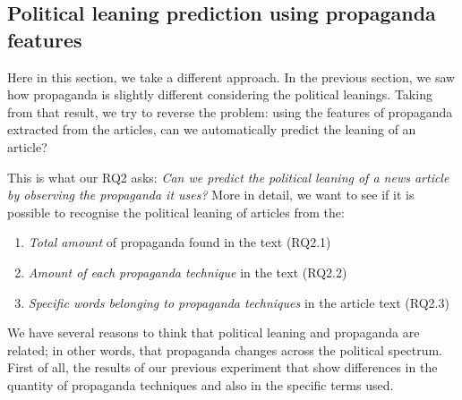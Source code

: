 







\subsection{\statusgreen Political leaning prediction using propaganda features}
\label{ssec:ps_prop_leaning_classifier}

Here in this section, we take a different approach.
In the previous section, we saw how propaganda is slightly different considering the political leanings.
Taking from that result, we try to reverse the problem: using the features of propaganda extracted from the articles, can we automatically predict the leaning of an article?

This is what our RQ2 asks: \emph{Can we predict the political leaning of a news article by observing the propaganda it uses?}
More in detail, we want to see if it is possible to recognise the political leaning of articles from the:
\begin{enumerate}
    \item \emph{Total amount} of propaganda found in the text (RQ2.1)
    \item \emph{Amount of each propaganda technique} in the text (RQ2.2)
    \item \emph{Specific words belonging to propaganda techniques} in the article text (RQ2.3)
\end{enumerate}

We have several reasons to think that political leaning and propaganda are related; in other words, that propaganda changes across the political spectrum.
First of all, the results of our previous experiment that show differences in the quantity of propaganda techniques and also in the specific terms used.

